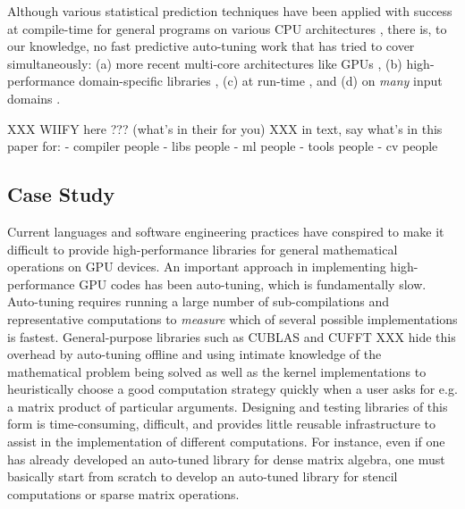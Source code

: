 \documentclass{sig-alternate}
\begin{document}
Although various statistical prediction techniques have been applied with
success at compile-time for general programs on various CPU architectures
\citep{monsifrot2002machine, stephenson2003meta, yotov2003comparison,
kulkarni2004fast, cooper2005acme, franke2005probabilistic,
hutter2006performance, cavazos2007rapidly, cavazos2008intelligent,
hartono2009annotation, park2011evaluation, fursin2008milepost}, there is, to
our knowledge, no fast predictive auto-tuning work that has tried to cover
simultaneously: (a) more recent multi-core architectures like GPUs
\citep{schaa2009exploring}, (b) high-performance domain-specific libraries
\citep{nukada2009auto, li2009note, kamil2010auto}, (c) at run-time
\citep{klockner2011pycuda, pinto+cox:2011gcg}, and (d) on \emph{many} input
domains \citep{liu2009cross, grauer2011optimizing}.

XXX WIIFY here ??? (what's in their for you) XXX in text, say what's in this paper for:
- compiler people
- libs people
- ml people
- tools people
- cv people





\subsection{Case Study}
Current languages and software engineering practices have conspired to make it difficult
to provide high-performance libraries for general mathematical operations on GPU devices.
An important approach in implementing high-performance GPU codes has been auto-tuning,
which is fundamentally slow. Auto-tuning requires running a large number of
sub-compilations and representative computations to {\em measure} which
of several possible implementations is fastest. General-purpose libraries such
as CUBLAS and CUFFT XXX hide this overhead by auto-tuning offline and using
intimate knowledge of the mathematical problem being solved as well as the
kernel implementations to heuristically choose a good computation strategy quickly when a
user asks for e.g. a matrix product of particular arguments.
Designing and testing libraries of this form is time-consuming, difficult, and provides little
reusable infrastructure to assist in the implementation of different computations.
For instance, even if one has already developed an auto-tuned library for dense matrix algebra, 
one must basically start from scratch to develop an auto-tuned library for
stencil computations or sparse matrix operations.
\end{document}

